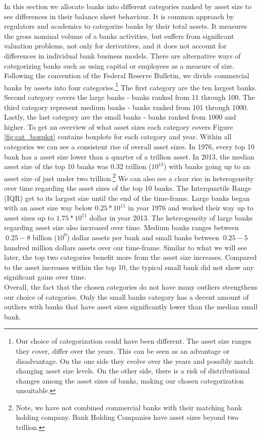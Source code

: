 \documentclass[12pt, a4paper]{article} %
\begin{document}
In this section we allocate banks into different categories ranked by asset size to see differences in their balance sheet behaviour. It is common approach by regulators and academics to categorize banks by their total assets. It measures the gross nominal volume of a banks activities, but suffers from significant valuation problems, not only for derivatives, and it does not account for differences in individual bank business models. There are alternative ways of categorizing banks such as using capital or employees as a measure of size. \\
Following the convention of the Federal Reserve Bulletin, we divide commercial banks by assets into four categories.\footnote{Our choice of categorization could have been different. The asset size ranges they cover, differ over the years. This can be seen as an advantage or disadvantage. On the one side they evolve over the years and possibly match changing asset size levels. On the other side, there is a risk of distributional changes among the asset sizes of banks, making our chosen categorization unsuitable.} The first category are the ten largest banks. Second category covers the large banks - banks ranked from 11 through 100. The third category represent medium banks - banks ranked from 101 through 1000. Lastly, the last category are the small banks - banks ranked from 1000 and higher.
To get an overview of what asset sizes each category covers Figure \ref{fig:cat_boxplot} contains boxplots for each category and year. Within all categories we can see a consistent rise of overall asset sizes.
In 1976, every top 10 bank has a asset size lower than a quarter of a trillion asset.
In 2013, the median asset size of the top 10 banks was $0.32$ trillion ($10^{12}$) with banks going up to an asset size of just under two trillion.\footnote{Note, we have not combined commercial banks with their matching bank holding company. Bank Holding Companies have asset sizes beyond two trillion.} We can also see a clear rise in heterogeneity over time regarding the asset sizes of the top 10 banks. The Interquartile Range (IQR) get to its largest size until the end of the time-frame.
Large banks began with an asset size way below $0.25*10^{11}$ in year 1976 and worked their way up to asset sizes up to $1.75*10^{11}$ dollar in year 2013. The heterogeneity of large banks regarding asset size also increased over time.
Medium banks ranges between $~0.25-8$ billion ($10^{9}$) dollar assets per bank and small banks between $~0.25-5$ hundred million dollars assets over our time-frame. Similar to what we will see later, the top two categories benefit more from the asset size increases. Compared to the asset increases within the top 10, the typical small bank did not show any significant gains over time. \\
Overall, the fact that the chosen categories do not have many outliers strengthens our choice of categories. Only the small banks category has a decent amount of outliers with banks that have asset sizes significantly lower than the median small bank. 
\end{document}
